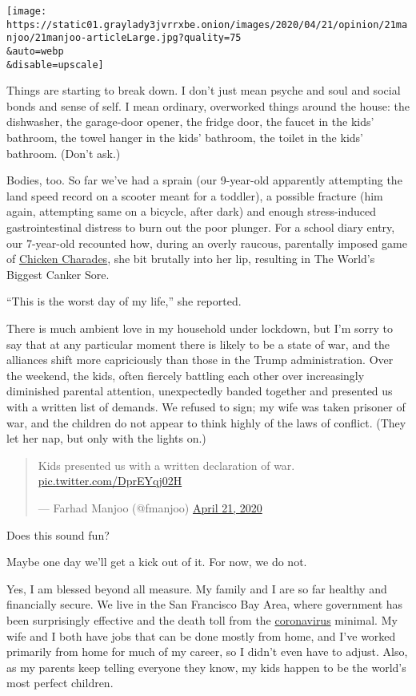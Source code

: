 \texttt{[image: https://static01.graylady3jvrrxbe.onion/images/2020/04/21/opinion/21manjoo/21manjoo-articleLarge.jpg?quality=75\\\&auto=webp\\\&disable=upscale]}

Things are starting to break down. I don't just mean psyche and soul and
social bonds and sense of self. I mean ordinary, overworked things
around the house: the dishwasher, the garage-door opener, the fridge
door, the faucet in the kids' bathroom, the towel hanger in the kids'
bathroom, the toilet in the kids' bathroom. (Don't ask.)

Bodies, too. So far we've had a sprain (our 9-year-old apparently
attempting the land speed record on a scooter meant for a toddler), a
possible fracture (him again, attempting same on a bicycle, after dark)
and enough stress-induced gastrointestinal distress to burn out the poor
plunger. For a school diary entry, our 7-year-old recounted how, during
an overly raucous, parentally imposed game of
\href{https://youtu.be/h2gaHOLu4tI}{Chicken Charades}, she bit brutally
into her lip, resulting in The World's Biggest Canker Sore.

``This is the worst day of my life,'' she reported.

There is much ambient love in my household under lockdown, but I'm sorry
to say that at any particular moment there is likely to be a state of
war, and the alliances shift more capriciously than those in the Trump
administration. Over the weekend, the kids, often fiercely battling each
other over increasingly diminished parental attention, unexpectedly
banded together and presented us with a written list of demands. We
refused to sign; my wife was taken prisoner of war, and the children do
not appear to think highly of the laws of conflict. (They let her nap,
but only with the lights on.)

\begin{quote}
Kids presented us with a written declaration of war.
\href{https://t.co/DprEYqj02H}{pic.twitter.com/DprEYqj02H}

--- Farhad Manjoo (@fmanjoo)
\href{https://twitter.com/fmanjoo/status/1252685070806048768?ref_src=twsrc\%5Etfw}{April
21, 2020}
\end{quote}

Does this sound fun?

Maybe one day we'll get a kick out of it. For now, we do not.

Yes, I am blessed beyond all measure. My family and I are so far healthy
and financially secure. We live in the San Francisco Bay Area, where
government has been surprisingly effective and the death toll from the
\href{https://www.nytimes3xbfgragh.onion/2020/06/17/parenting/public-toilets-virus-kids.html}{coronavirus}
minimal. My wife and I both have jobs that can be done mostly from home,
and I've worked primarily from home for much of my career, so I didn't
even have to adjust. Also, as my parents keep telling everyone they
know, my kids happen to be the world's most perfect children.

